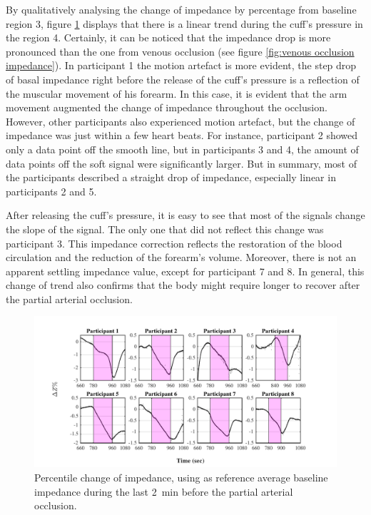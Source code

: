 By qualitatively analysing the change of impedance by percentage from baseline region 3, figure \ref{fig:arterial occlusion imepdance} displays that there is a linear trend during the cuff's pressure in the region 4. Certainly, it can be noticed that the impedance drop is more pronounced than the one from venous occlusion (see figure \ref{fig:venous occlusion impedance}). In participant 1 the motion artefact is more evident, the step drop of basal impedance right before the release of the cuff's pressure is a reflection of the muscular movement of his forearm. In this case, it is evident that the arm movement augmented the change of impedance throughout the occlusion. However, other participants also experienced motion artefact, but the change of impedance was just within a few heart beats. For instance, participant 2 showed only a data point off the smooth line, but in participants 3 and 4, the amount of data points off the soft signal were significantly larger. But in summary, most of the participants described a straight drop of impedance, especially linear in participants 2 and 5. 

After releasing the cuff's pressure, it is easy to see that most of the signals change the slope of the signal. The only one that did not reflect this change was participant 3. This impedance correction reflects the restoration of the blood circulation and the reduction of the forearm's volume. Moreover, there is not an apparent settling impedance value, except for participant 7 and 8. In general, this change of trend also confirms that the body might require longer to recover after the partial arterial occlusion.

\begin{figure}[htbp]
	\centering
	\includegraphics[width=15cm,keepaspectratio]{figure_vop_5}    
	\caption[Percentile variation of impedance during partial arterial occlusion]{Percentile change of impedance, using as reference average baseline impedance during the last \SI{2}{\minute} before the partial arterial occlusion.}
	\label{fig:arterial occlusion imepdance}
\end{figure}  

